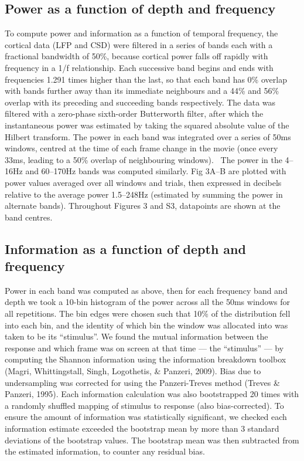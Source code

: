 \subsection[Power as a function of depth and frequency]{Power as a function of depth and frequency}
To compute power and information as a function of temporal frequency, the cortical data (LFP and CSD) were filtered in a series of bands each with a fractional bandwidth of 50\%, because cortical power falls off rapidly with frequency in a 1/f relationship. Each successive band begins and ends with frequencies 1.291 times higher than the last, so that each band has 0\% overlap with bands further away than its immediate neighbours and a 44\% and 56\% overlap with its preceding and succeeding bands respectively. The data was filtered with a zero-phase sixth-order Butterworth filter, after which the instantaneous power was estimated by taking the squared absolute value of the Hilbert transform. The power in each band was integrated over a series of 50ms windows, centred at the time of each frame change in the movie (once every 33ms, leading to a 50\% overlap of neighbouring windows). \ The power in the 4--16Hz and 60--170Hz bands was computed similarly. Fig 3A--B are plotted with power values averaged over all windows and trials, then expressed in decibels relative to the average power 1.5--248Hz (estimated by summing the power in alternate bands). Throughout Figures 3 and S3, datapoints are shown at the band centres.

\subsection{Information as a function of depth and frequency}
Power in each band was computed as above, then for each frequency band and depth we took a 10-bin histogram of the power across all the 50ms windows for all repetitions. The bin edges were chosen such that 10\% of the distribution fell into each bin, and the identity of which bin the window was allocated into was taken to be its ``stimulus''. We found the mutual information between the response and which frame was on screen at that time --- the ``stimulus'' --- by computing the Shannon information using the information breakdown toolbox (Magri, Whittingstall, Singh, Logothetis, \& Panzeri, 2009). Bias due to undersampling was corrected for using the Panzeri-Treves method (Treves \& Panzeri, 1995). Each information calculation was also bootstrapped 20 times with a randomly shuffled mapping of stimulus to response (also bias-corrected). To ensure the amount of information was statistically significant, we checked each information estimate exceeded the bootstrap mean by more than 3 standard deviations of the bootstrap values. The bootstrap mean was then subtracted from the estimated information, to counter any residual bias.

